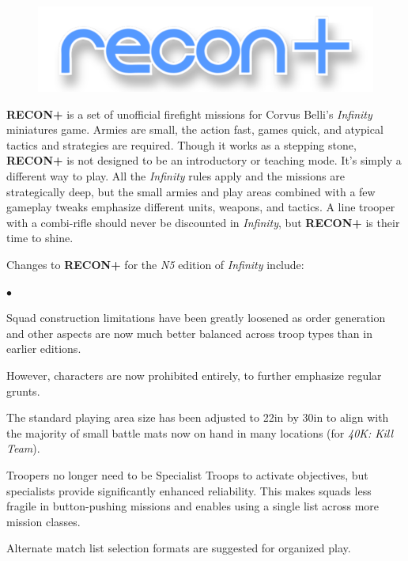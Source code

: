 \documentclass[14pt,dvipsnames]{extarticle}
\newenvironment{squishitemize}
{\begin{list}{$\bullet$}{%
    \setlength{\itemsep}{2pt}%
    \setlength{\parsep}{2pt}%
    \setlength{\topsep}{2pt}%
    \setlength{\parskip}{0pt} %
    \renewcommand{\labelitemi}{--}}}
  {\end{list}}
\newcommand{\reconplus}{\textbf{RECON+}\xspace}
\newcommand\BackgroundPic[1]{%
\put(0,0){%
\parbox[b][\paperheight]{\paperwidth}{%
\vfill%
\centering%
\texttt{[image: \#1]}%
\vfill%
}}}
\newcommand{\setbackground}{%
\AddToShipoutPicture{\BackgroundPic{art/background/background.pdf}}%
}
\begin{document}
\thispagestyle{empty}


\clearpage


\begin{figure}[t!]
  \centering
  \includegraphics{art/cover/title.pdf}
\end{figure}

\reconplus is a set of unofficial firefight missions for Corvus
Belli's \emph{Infinity} miniatures game.  Armies are small, the action
fast, games quick, and atypical tactics and strategies are required.
Though it works as a stepping stone, \reconplus is not designed to be
an introductory or teaching mode.  It's simply a different way to
play.  All the \emph{Infinity} rules apply and the missions are
strategically deep, but the small armies and play areas combined with
a few gameplay tweaks emphasize different units, weapons, and tactics.
A line trooper with a combi-rifle should never be discounted in
\emph{Infinity}, but \reconplus is their time to shine.


Changes to \reconplus for the \emph{N5} edition of \emph{Infinity}
include:
\begin{squishitemize}
\item Squad construction limitations have been greatly loosened as
  order generation and other aspects are now much better balanced
  across troop types than in earlier editions.

\item However, characters are now prohibited entirely, to further
  emphasize regular grunts.

\item The standard playing area size has been adjusted to 22in by 30in
  to align with the majority of small battle mats now on hand in many
  locations (for \emph{40K: Kill Team}).

\item Troopers no longer need to be Specialist Troops to activate
  objectives, but specialists provide significantly enhanced
  reliability. This makes squads less fragile in button-pushing
  missions and enables using a single list across more mission
  classes.

\item Alternate match list selection formats are suggested for
  organized play.
\end{squishitemize}
\end{document}
